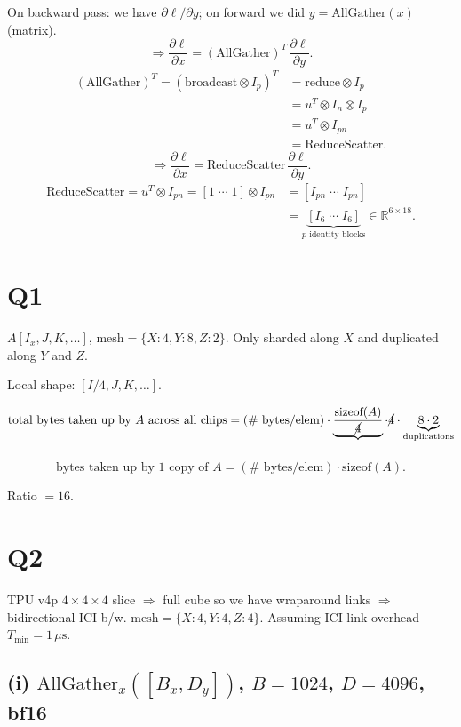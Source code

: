 \documentclass[11pt]{article}
\newcommand{\Tmin}{T_{\min}}
\begin{document}
On backward pass: we have $\partial \ell / \partial y$; on forward we did $y = \text{AllGather}(x)$ (matrix).
\[
\Rightarrow \frac{\partial \ell}{\partial x} = (\text{AllGather})^T\, \frac{\partial \ell}{\partial y}.
\]
\begin{align*}
(\text{AllGather})^T = (\text{broadcast} \otimes I_p)^T &= \text{reduce} \otimes I_p \\
&= u^T \otimes I_n \otimes I_p \\
&= u^T \otimes I_{pn} \\
&= \text{ReduceScatter}.
\end{align*}
\[
\Rightarrow \frac{\partial \ell}{\partial x} = \text{ReduceScatter}\, \frac{\partial \ell}{\partial y}.
\]
\begin{align*}
\text{ReduceScatter} = u^T \otimes I_{pn} = [1\;\cdots\;1] \otimes I_{pn}
&= [I_{pn}\;\cdots\;I_{pn}] \\
&= \underbrace{[I_6\;\cdots\;I_6]}_{p \text{ identity blocks}} \in \mathbb{R}^{6 \times 18}.
\end{align*}

\section*{Q1}

$A[I_x, J, K, \ldots]$, $\text{mesh} = \{X{:}4, Y{:}8, Z{:}2\}$. Only sharded along $X$ and duplicated along $Y$ and $Z$.

Local shape: $[I/4, J, K, \ldots]$.

\[
\text{total bytes taken up by } A \text{ across all chips}
= (\#\text{ bytes/elem}) \cdot \underbrace{\frac{\text{sizeof}(A)}{\cancel{4}}}_{} \cdot \cancel{4} \cdot \underbrace{8 \cdot 2}_{\text{duplications}}
\]

\[
\text{bytes taken up by 1 copy of } A = (\#\text{ bytes/elem}) \cdot \text{sizeof}(A).
\]

Ratio $= 16$.

\section*{Q2}

TPU v4p $4 \times 4 \times 4$ slice $\Rightarrow$ full cube so we have wraparound links $\Rightarrow$ bidirectional ICI b/w.
$\text{mesh} = \{X{:}4, Y{:}4, Z{:}4\}$. Assuming ICI link overhead $\Tmin = 1\,\mu\text{s}$.

\subsection*{(i) $\text{AllGather}_x([B_x, D_y])$, $B = 1024$, $D = 4096$, bf16}
\end{document}
